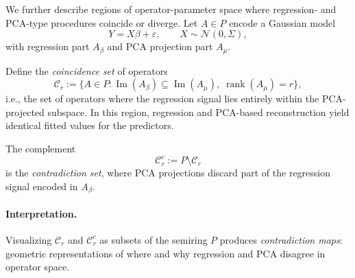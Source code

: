 We further describe regions of operator-parameter space where regression- and 
PCA-type procedures coincide or diverge. Let $A \in P$ encode a Gaussian model
\[
Y = X \beta + \varepsilon, \qquad X \sim \mathcal{N}(0, \Sigma),
\]
with regression part $A_\beta$ and PCA projection part $A_\mu$.

Define the \emph{coincidence set} of operators
\[
\mathcal{C}_r := \{ A \in P : \operatorname{Im}(A_\beta) \subseteq \operatorname{Im}(A_\mu), \; \operatorname{rank}(A_\mu) = r \},
\]
i.e., the set of operators where the regression signal lies entirely within the PCA-projected subspace. In this region, regression and PCA-based reconstruction yield identical fitted values for the predictors.

The complement
\[
\mathcal{C}_r^c := P \setminus \mathcal{C}_r
\]
is the \emph{contradiction set}, where PCA projections discard part of the regression signal encoded in $A_\beta$.

\paragraph{Interpretation.}  
Visualizing $\mathcal{C}_r$ and $\mathcal{C}_r^c$ as subsets of the semiring $P$ produces \emph{contradiction maps}: geometric representations of where and why regression and PCA disagree in operator space.